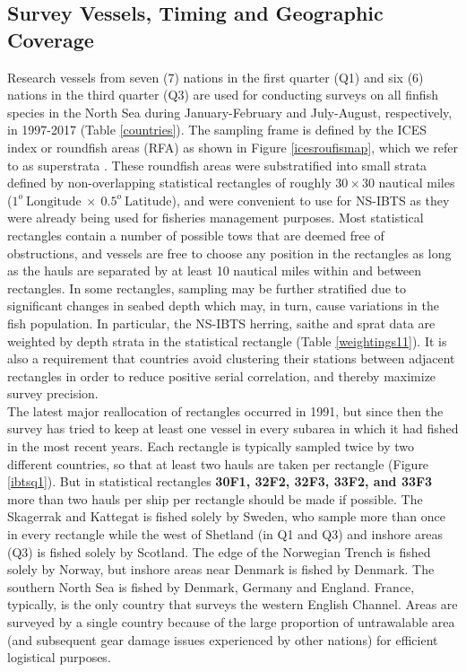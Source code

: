 \documentclass[a4paper 12pt]{article}
\numberwithin{equation}{section}
\begin{document}
\subsection{Survey Vessels, Timing and Geographic Coverage}
Research vessels from seven (7) nations in the first quarter (Q1) and six (6) nations in the third quarter (Q3) are used for conducting surveys on all finfish species in the North Sea during January-February and July-August, respectively, in 1997-2017 (Table \ref{countries}). The sampling frame is defined by the ICES index or roundfish areas (RFA) as shown in Figure \ref{icesroufismap}, which we refer to as superstrata \citep{nottestad2015quantifying, fuller2011sampling}. These  roundfish areas were substratified into small strata defined by non-overlapping statistical rectangles of roughly $30 \times 30$ nautical miles ($1^{o} \  \mathrm{Longitude} \ \times  \  0.5^{o} \ \mathrm{Latitude}$), and were convenient to use for NS-IBTS as they were already being used for fisheries management purposes. Most statistical rectangles contain a number of possible tows that are deemed free of obstructions, and vessels are free to choose any position in the rectangles as long as the hauls are separated by at least 10 nautical miles within and between rectangles. In some rectangles, sampling may be further stratified due to significant changes in seabed depth which may, in turn, cause variations in the fish population. In particular, the NS-IBTS herring, saithe and sprat data are weighted by depth strata in the statistical rectangle (Table \ref{weightings11}). It is also a requirement that countries avoid clustering their stations between adjacent rectangles in order to reduce positive serial correlation, and thereby maximize survey precision. \\
\indent The latest major reallocation of rectangles occurred in 1991, but since then the survey has tried to keep at least one vessel in every subarea in which it had fished in the most recent years. Each rectangle is typically sampled twice by two different countries, so that at least two hauls are taken per rectangle (Figure \ref{ibtsq1}). But in statistical rectangles {\bf  30F1, 32F2, 32F3, 33F2, and 33F3} more than two hauls per ship per rectangle should be made if possible. The Skagerrak and Kattegat is fished solely by Sweden, who sample more than once in every rectangle while the west of Shetland (in Q1 and Q3) and inshore areas (Q3) is fished solely by Scotland. The edge of the Norwegian Trench is fished solely by Norway, but inshore areas near Denmark is fished by Denmark. The southern North Sea is fished by Denmark, Germany and England. France, typically, is the only country that surveys the western English Channel. Areas are surveyed by a single country because of the large proportion of untrawalable area (and subsequent gear damage issues experienced by other nations)  for efficient logistical purposes.\\
\end{document}
